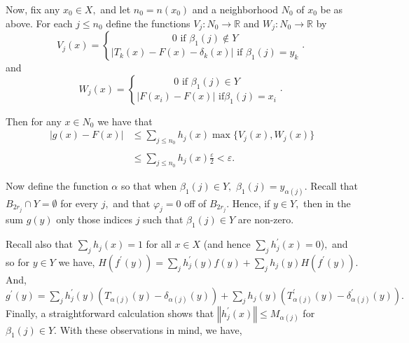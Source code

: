 \documentclass[11pt]{amsproc}%
\theoremstyle{plain}
\numberwithin{equation}{section}
\begin{document}
Now, fix any $x_{0}\in X,$ and let $n_{0}=n\left(  x_{0}\right)  $ and a
neighborhood $N_{0}$ of $x_{0}$ be as above. For each $j\leq n_{0}$ define the
functions $V_{j}:N_{0}\rightarrow\mathbb{R}$ and $W_{j}:N_{0}\rightarrow
\mathbb{R}$ by%
\[
V_{j}(x)=%
\genfrac{\{}{.}{0pt}{}{0\text{ if }\beta_{1}(j)\notin Y}{\left\vert
T_{k}\left(  x\right)  -F\left(  x\right)  -\delta_{k}\left(  x\right)
\right\vert \text{ if }\beta_{1}(j)=y_{k}}%
\]
and%
\[
W_{j}(x)=%
\genfrac{\{}{.}{0pt}{}{0\text{ if }\beta_{1}(j)\in Y}{|F(x_{i})-F(x)|\text{ if
}\beta_{1}(j)=x_{i}}%
\]


\medskip

\noindent Then for any $x\in N_{0}$ we have that
\begin{align*}
\left\vert g\left(  x\right)  -F\left(  x\right)  \right\vert  &  \leq
\sum_{j\leq n_{0}}h_{j}\left(  x\right)  \max\{V_{j}(x),W_{j}(x)\}\\
& \\
&  \leq\sum_{j\leq n_{0}}h_{j}\left(  x\right)  \frac{\varepsilon}%
{2}<\varepsilon.
\end{align*}


\noindent Now define the function $\alpha$ so that when $\beta_{1}(j)\in Y,$
$\beta_{1}(j)=y_{\alpha(j)}$. Recall that $B_{2r_{j}}\cap Y=\emptyset$ for
every $j,$ and that $\varphi_{j}=0$ off of $B_{2r_{j}}.$ Hence, if $y\in Y,$
then in the sum $g\left(  y\right)  $ only those indices $j$ such that
$\beta_{1}(j)\in Y$ are non-zero.

\medskip

\noindent Recall also that $\sum_{j}h_{j}\left(  x\right)  =1$ for all $x\in
X$ (and hence $\sum_{j}h_{j}^{\prime}\left(  x\right)  =0$)$,$ and so for
$y\in Y$ we have, $H\left(  f^{\prime}\left(  y\right)  \right)  =\sum
_{j}h_{j}^{\prime}\left(  y\right)  f\left(  y\right)  +\sum_{j}h_{j}\left(
y\right)  H\left(  f^{\prime}\left(  y\right)  \right)  .$ And, $g^{\prime
}\left(  y\right)  =\sum_{j}h_{j}^{\prime}\left(  y\right)  \left(
T_{\alpha(j)}\left(  y\right)  -\delta_{\alpha(j)}\left(  y\right)  \right)
+\sum_{j}h_{j}\left(  y\right)  \left(  T_{\alpha(j)}^{\prime}\left(
y\right)  -\delta_{\alpha(j)}^{\prime}\left(  y\right)  \right)  .$ Finally, a
straightforward calculation shows that $\left\Vert h_{j}^{\prime
}(x)\right\Vert \leq M_{\alpha(j)}$ for $\beta_{1}(j)\in Y$. With these
observations in mind, we have,
\end{document}
